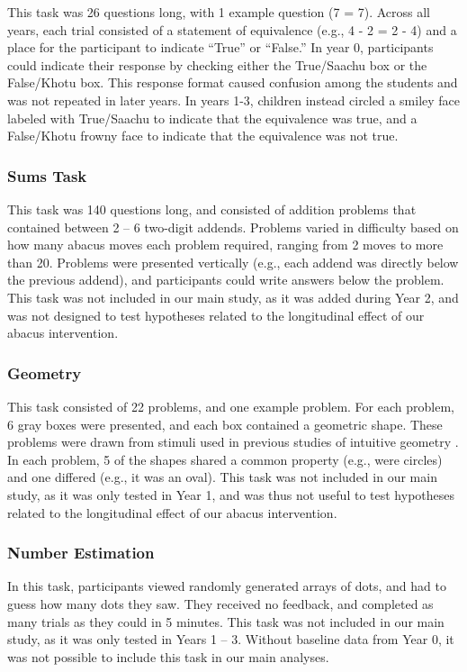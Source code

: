 \documentclass[11pt]{article}
\begin{document}
This task was 26 questions long, with 1 example question (7 = 7). Across all years, each trial consisted of a statement of equivalence (e.g., 4 - 2 = 2 - 4) and a place for the participant to indicate ``True'' or ``False.'' In year 0, participants could indicate their response by checking either the True/Saachu box or the False/Khotu box. This response format caused confusion among the students and was not repeated in later years. In years 1-3, children instead circled a smiley face labeled with True/Saachu to indicate that the equivalence was true, and a False/Khotu frowny face to indicate that the equivalence was not true.  

\subsubsection{Sums Task}

This task was 140 questions long, and consisted of addition problems that contained between 2 -- 6 two-digit addends. Problems varied in difficulty based on how many abacus moves each problem required, ranging from 2 moves to more than 20. Problems were presented vertically (e.g., each addend was directly below the previous addend), and participants could write answers below the problem. This task was not included in our main study, as it was added during Year 2, and was not designed to test hypotheses related to the longitudinal effect of our abacus intervention.

\subsubsection{Geometry}

This task consisted of 22 problems, and one example problem. For each problem, 6 gray boxes were presented, and each box contained a geometric shape. These problems were drawn from stimuli used in previous studies of intuitive geometry \cite{dehaene2006}. In each problem, 5 of the shapes shared a common property (e.g., were circles) and one differed (e.g., it was an oval). This task was not included in our main study, as it was only tested in Year 1, and was thus not useful to test hypotheses related to the longitudinal effect of our abacus intervention.

\subsubsection{Number Estimation}

 In this task, participants viewed randomly generated arrays of dots, and had to guess how many dots they saw. They received no feedback, and completed as many trials as they could in 5 minutes. This task was not included in our main study, as it was only tested in Years 1 -- 3. Without baseline data from Year 0, it was not possible to include this task in our main analyses.
\end{document}
